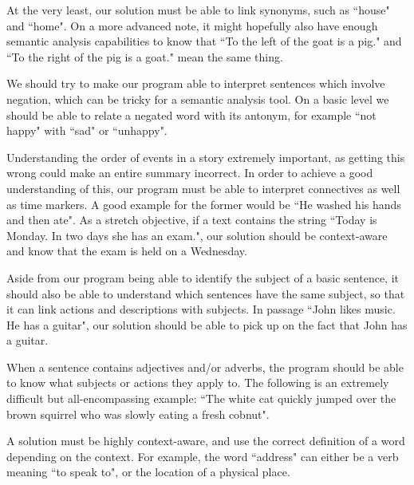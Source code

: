 \begin{objective}[Periphrasis]
At the very least, our solution must be able to link synonyms, such as ``house" and ``home". On a more advanced note, it might hopefully also have enough semantic analysis capabilities to know that ``To the left of the goat is a pig." and ``To the right of the pig is a goat." mean the same thing.
\end{objective}

\begin{objective}[Negation]
We should try to make our program able to interpret sentences which involve negation, which can be tricky for a semantic analysis tool. On a basic level we should be able to relate a negated word with its antonym, for example ``not happy" with ``sad" or ``unhappy".
\end{objective}

\begin{objective}
Understanding the order of events in a story extremely important, as getting this wrong could make an entire summary incorrect. In order to achieve a good understanding of this, our program must be able to interpret connectives as well as time markers. A good example for the former would be ``He washed his hands and then ate". As a stretch objective, if a text contains the string ``Today is Monday. In two days she has an exam.", our solution should be context-aware and know that the exam is held on a Wednesday.
\end{objective}

\begin{objective}
Aside from our program being able to identify the subject of a basic sentence, it should also be able to understand which sentences have the same subject, so that it can link actions and descriptions with subjects. In passage ``John likes music. He has a guitar", our solution should be able to pick up on the fact that John has a guitar.
\end{objective}

\begin{objective}
When a sentence contains adjectives and/or adverbs, the program should be able to know what subjects or actions they apply to. The following is an extremely difficult but all-encompassing example: ``The white cat quickly jumped over the brown squirrel who was slowly eating a fresh cobnut".
\end{objective}

\begin{objective}[Context]
A solution must be highly context-aware, and use the correct definition of a word depending on the context. For example, the word ``address" can either be a verb meaning ``to speak to", or the location of a physical place.
\end{objective}